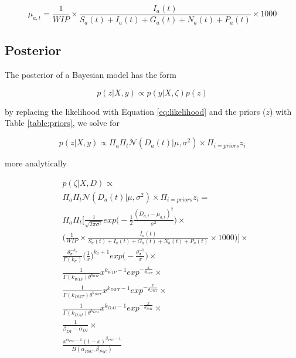 \documentclass[12pt]{article}
\begin{document}
\begin{equation}
\mu_{a, t} = \frac{1}{WIP}\times \frac{I_{a}(t)}{S_{a}(t) + I_{a}(t) + G_{a}(t) + N_{a}(t) + P_{a}(t)}\times 1000
\end{equation}


\subsection{Posterior}

The posterior of a Bayesian model has the form

\begin{equation}
p(z|X, y) \propto p(y|X,\zeta)p(z)
\label{eq:bayes_posterior}
\end{equation}

by replacing the likelihood with Equation \ref{eq:likelihood} and the priors ($z$) with Table \ref{table:priors}, we solve for

\begin{equation}
p(z|X, y) \propto \Pi_{a}\Pi_{t}\mathcal{N}(D_{a}(t)| \mu, \sigma^2) \times \Pi_{i=priors} z_{i}
\label{eq:posterior}
\end{equation}

more analytically

\begin{align}
\label{eq:posterior_unormal}
& p(\zeta|X, D) \propto \\ \nonumber
& \Pi_{a}\Pi_{t}\mathcal{N}(D_{a}(t)| \mu, \sigma^2) \times \Pi_{i=priors} z_{i} = \\ \nonumber
& \Pi_{a}\Pi_{t} \bigg[ \frac{1}{\sqrt{2\pi \sigma^2}} exp\bigg(-\frac{1}{2}\frac{(D_{a,t} - \mu_{a, t})^{2}}{\sigma^2} \bigg) \times \\\nonumber
& \bigg( \frac{1}{WIP}\times \frac{I_{a}(t)}{S_{a}(t) + I_{a}(t) + G_{a}(t) + N_{a}(t) + P_{a}(t)}\times 1000 \bigg) \bigg] \times \\ \nonumber
& \frac{\theta_{\sigma}^{-k_{\sigma}}}{\Gamma(k_{\sigma})}\bigg(\frac{1}{x} \bigg)^{k_{\sigma} + 1} exp\bigg(-\frac{\theta_{\sigma}^{-1}}{x} \bigg) \times \\ \nonumber
& \frac{1}{\Gamma(k_{WIP})\theta^{k_{WIP}}}x^{k_{WIP}-1}exp^{-\frac{x}{\theta_{WIP}}} \times \\ \nonumber
& \frac{1}{\Gamma(k_{DWT})\theta^{k_{DWT}}}x^{k_{DWT}-1}exp^{-\frac{x}{\theta_{DWT}}} \times \\ \nonumber
& \frac{1}{\Gamma(k_{DAI})\theta^{k_{DAI}}}x^{k_{DAI}-1}exp^{-\frac{x}{\theta_{DAI}}} \times \\ \nonumber
& \frac{1}{\beta_{DI} - \alpha_{DI}}\times \\ \nonumber
& \frac{x^{\alpha_{PSC} - 1} (1 - x)^{\beta_{PSC} - 1}}{B(\alpha_{PSC},\beta_{PSC})} \\ \nonumber
\end{align}
\end{document}
